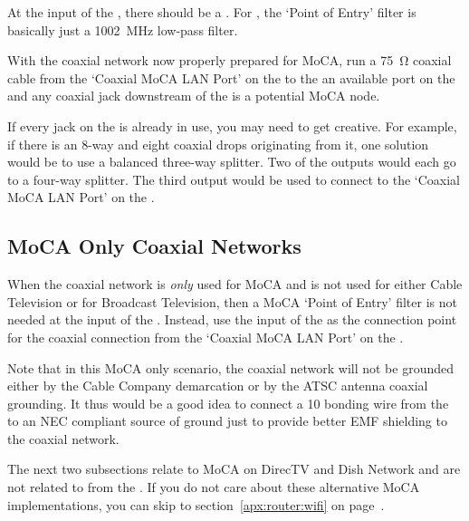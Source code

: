 At the input of the , there should be a
. For \xdband{},
the `Point of Entry' filter is basically just a \qty{1002}{\mega\hertz} low-pass filter.

With the coaxial network now properly prepared for MoCA, run a \qty{75}{\ohm} coaxial cable from the
`Coaxial MoCA LAN Port' on the  to the an available port on the
 and any coaxial jack downstream of the 
is a potential \xdband{} MoCA node.

If every jack on the  is already in use, you may need to get creative. For example,
if there is an 8-way  and eight coaxial drops originating from it, one solution would
be to use a
balanced three-way splitter. Two of the outputs would each go to a
four-way splitter. The third output would be used to connect to the `Coaxial MoCA LAN Port' on the
.


\subsection{MoCA Only Coaxial Networks}

When the coaxial network is \emph{only} used for MoCA and is not used for either Cable Television or for
Broadcast Television, then a MoCA `Point of Entry' filter is not needed at the input of the .
Instead, use the input of the  as the connection point for the coaxial connection from the
`Coaxial MoCA LAN Port' on the .

Note that in this MoCA only scenario, the coaxial network will not be grounded either by the Cable Company
demarcation or by the ATSC antenna coaxial grounding. It thus would be a good idea to connect a \qty{10}{\awg}
bonding wire from the  to an NEC compliant source of ground just to provide better
EMF shielding to the coaxial network.

The next two subsections relate to MoCA on DirecTV and Dish Network and are not related to \xdband{}
from the . If you do not care about these alternative MoCA implementations, you
can skip to section~\ref{apx:router:wifi} on page~\pageref{apx:router:wifi}.

